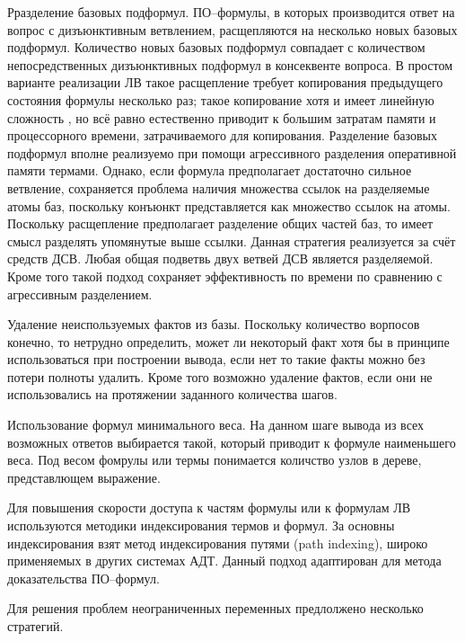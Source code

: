 \documentclass[a4paper]{report}
\begin{document}
Рразделение базовых подформул. ПО--формулы, в которых производится ответ на вопрос с дизъюнктивным ветвлением, расщепляются на несколько новых базовых подформул. Количество новых базовых подформул совпадает с количеством непосредственных дизъюнктивных подформул в консеквенте вопроса. В простом варианте реализации ЛВ \cite{dissChe} такое расщепление требует копирования предыдущего состояния формулы несколько раз; такое копирование хотя и имеет линейную сложность \cite{Che2}, но всё равно естественно приводит к большим затратам памяти и процессорного времени, затрачиваемого для копирования. Разделение базовых подформул вполне реализуемо при помощи агрессивного разделения оперативной памяти термами. Однако, если формула предполагает достаточно сильное ветвление, сохраняется проблема наличия множества ссылок на разделяемые атомы баз, поскольку конъюнкт представляется как множество ссылок на атомы. Поскольку расщепление предполагает разделение общих частей баз, то имеет смысл разделять упомянутые выше ссылки. Данная стратегия реализуется за счёт средств ДСВ. Любая общая подветвь двух ветвей ДСВ является разделяемой. Кроме того такой подход сохраняет эффективность по времени по сравнению с агрессивным разделением.

Удаление неиспользуемых фактов из базы. Поскольку количество ворпосов конечно, то нетрудно определить, может ли некоторый факт хотя бы в принципе использоваться при построении вывода, если нет то такие факты можно без потери полноты удалить. Кроме того возможно удаление фактов, если они не использовались на протяжении заданного количества шагов.

Использование формул минимального веса. На данном шаге вывода из всех возможных ответов выбирается такой, который приводит к формуле наименьшего веса. Под весом фомрулы или термы понимается количство узлов в дереве, представлющем выражение.

Для повышения скорости доступа к частям формулы или к формулам ЛВ используются методики индексирования термов и формул. За основны индексирования взят метод индексирования путями (path indexing), широко применяемых в других системах АДТ. Данный подход адаптирован для метода доказательства ПО--формул.

Для решения проблем неограниченных переменных предлолжено несколько стратегий.
\end{document}

